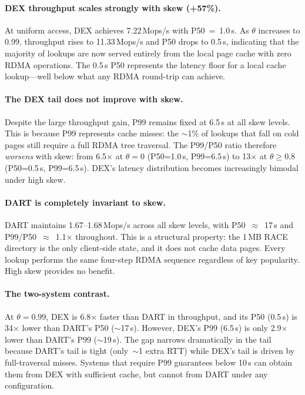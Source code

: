 \documentclass[sigconf, nonacm]{acmart}
\begin{document}
\paragraph{DEX throughput scales strongly with skew (+57\%).}
At uniform access, DEX achieves 7.22\,Mops/s with P50~=~1.0\,\textmu s. As $\theta$ increases to 0.99, throughput rises to 11.33\,Mops/s and P50 drops to 0.5\,\textmu s, indicating that the majority of lookups are now served entirely from the local page cache with zero RDMA operations. The 0.5\,\textmu s P50 represents the latency floor for a local cache lookup---well below what any RDMA round-trip can achieve.

\paragraph{The DEX tail does not improve with skew.}
Despite the large throughput gain, P99 remains fixed at 6.5\,\textmu s at all skew levels. This is because P99 represents cache misses: the ${\sim}$1\% of lookups that fall on cold pages still require a full RDMA tree traversal. The P99/P50 ratio therefore \emph{worsens} with skew: from 6.5$\times$ at $\theta{=}0$ (P50=1.0\,\textmu s, P99=6.5\,\textmu s) to 13$\times$ at $\theta{\ge}0.8$ (P50=0.5\,\textmu s, P99=6.5\,\textmu s). DEX's latency distribution becomes increasingly bimodal under high skew.

\paragraph{DART is completely invariant to skew.}
DART maintains 1.67--1.68\,Mops/s across all skew levels, with P50~$\approx$~17\,\textmu s and P99/P50~$\approx$~1.1$\times$ throughout. This is a structural property: the 1\,MB RACE directory is the only client-side state, and it does not cache data pages. Every lookup performs the same four-step RDMA sequence regardless of key popularity. High skew provides no benefit.

\paragraph{The two-system contrast.}
At $\theta{=}0.99$, DEX is 6.8$\times$ faster than DART in throughput, and its P50 (0.5\,\textmu s) is 34$\times$ lower than DART's P50 (${\sim}$17\,\textmu s). However, DEX's P99 (6.5\,\textmu s) is only 2.9$\times$ lower than DART's P99 (${\sim}$19\,\textmu s). The gap narrows dramatically in the tail because DART's tail is tight (only~${\sim}$1 extra RTT) while DEX's tail is driven by full-traversal misses. Systems that require P99 guarantees below 10\,\textmu s can obtain them from DEX with sufficient cache, but cannot from DART under any configuration.
\end{document}
